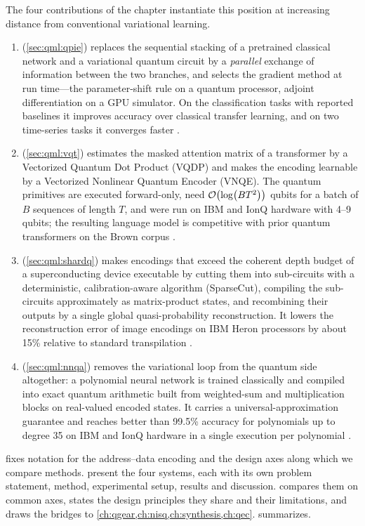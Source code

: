 The four contributions of the chapter instantiate this position at increasing distance from conventional variational learning.
\begin{enumerate}
\item \qpie{} (\cref{sec:qml:qpie}) replaces the sequential stacking of a pretrained classical network and a variational quantum circuit by a \emph{parallel} exchange of information between the two branches, and selects the gradient method at run time---the parameter-shift rule on a quantum processor, adjoint differentiation on a GPU simulator. On the classification tasks with reported baselines it improves accuracy over classical transfer learning, and on two time-series tasks it converges faster \cite{guo2025qpie}.
\item \vqt{} (\cref{sec:qml:vqt}) estimates the masked attention matrix of a transformer by a Vectorized Quantum Dot Product (VQDP) and makes the encoding learnable by a Vectorized Nonlinear Quantum Encoder (VNQE). The quantum primitives are executed forward-only, need $\mathcal{O}\!\left(\log (BT^2)\right)$ qubits for a batch of $B$ sequences of length $T$, and were run on IBM and IonQ hardware with 4--9 qubits; the resulting language model is competitive with prior quantum transformers on the Brown corpus \cite{guo2025vqt}.
\item \shardq{} (\cref{sec:qml:shardq}) makes encodings that exceed the coherent depth budget of a superconducting device executable by cutting them into sub-circuits with a deterministic, calibration-aware algorithm (SparseCut), compiling the sub-circuits approximately as matrix-product states, and recombining their outputs by a single global quasi-probability reconstruction. It lowers the reconstruction error of image encodings on IBM Heron processors by about 15\% relative to standard transpilation \cite{guo2025shardq}.
\item \nnqa{} (\cref{sec:qml:nnqa}) removes the variational loop from the quantum side altogether: a polynomial neural network is trained classically and compiled into exact quantum arithmetic built from weighted-sum and multiplication blocks on real-valued encoded states. It carries a universal-approximation guarantee and reaches better than 99.5\% accuracy for polynomials up to degree 35 on IBM and IonQ hardware in a single execution per polynomial \cite{guo2026nnqa}.
\end{enumerate}

 fixes notation for the address--data encoding and the design axes along which we compare methods.  present the four systems, each with its own problem statement, method, experimental setup, results and discussion.  compares them on common axes, states the design principles they share and their limitations, and draws the bridges to \cref{ch:qgear,ch:nisq,ch:synthesis,ch:qec}.  summarizes.

